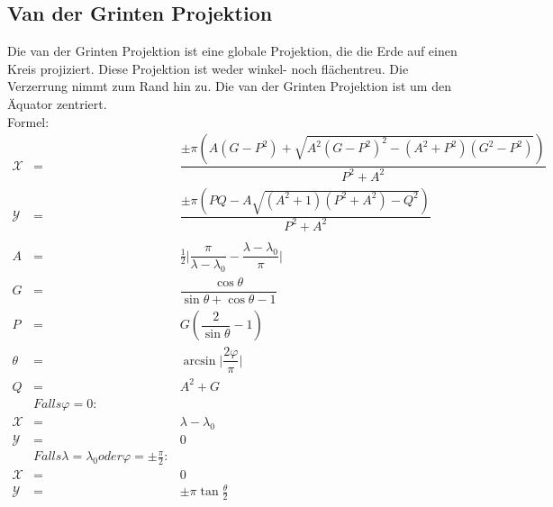 \subsection{Van der Grinten Projektion}
\label{sec:vander}
Die van der Grinten Projektion ist eine globale Projektion, die die Erde auf einen Kreis projiziert. Diese Projektion ist weder winkel- noch flächentreu. Die Verzerrung nimmt zum Rand hin zu. Die van der Grinten Projektion ist um den Äquator zentriert.\\
Formel:\\
\begin{eqnarray*}
\mathcal{X}&=&\dfrac{\pm \pi(A(G-P^2)+\sqrt{A^2(G-P^2)^2 -(A^2 +P^2)(G^2 -P^2)})}{P^2 +A^2}\\
\mathcal{Y}&=&\dfrac{\pm \pi (PQ-A\sqrt{(A^2 +1)(P^2 +A^2)-Q^2})}{P^2 +A^2}\\
\\
A&=&\frac{1}{2}\vert \dfrac{\pi}{\lambda -\lambda _0}-\dfrac{\lambda -\lambda _0}{\pi}\vert\\
G&=&\dfrac{\cos \theta}{\sin \theta +\cos \theta -1}\\
P&=&G(\dfrac{2}{\sin\theta}-1)\\
\theta &=&\arcsin \vert\dfrac{2\varphi}{\pi}\vert\\
Q&=&A^2 +G\\
 &Falls \varphi =0:\\
 \mathcal{X}&=&\lambda -\lambda _0\\
 \mathcal{Y}&=&0\\
 &Falls \lambda =\lambda _0 oder \varphi =\pm\frac{\pi}{2}:\\
 \mathcal{X}&=&0\\
 \mathcal{Y}&=&\pm \pi \tan \frac{\theta}{2}
\end{eqnarray*}